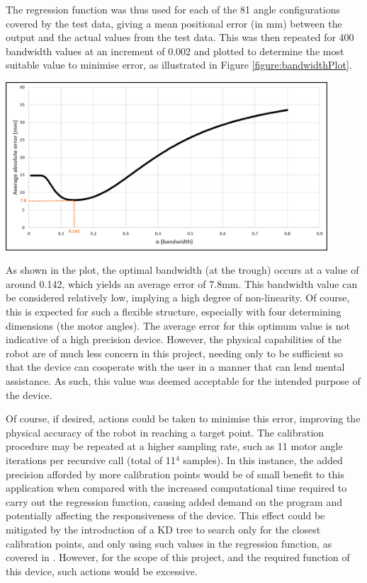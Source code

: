 \documentclass[11pt]{article}
\begin{document}
The regression function was thus used for each of the 81 angle configurations covered by the test data, giving a mean positional error (in mm) between the output and the actual values from the test data. This was then repeated for 400 bandwidth values at an increment of 0.002 and plotted to determine the most suitable value to minimise error, as illustrated in Figure \ref{figure:bandwidthPlot}.


\begin{center}
\includegraphics[width=0.9\textwidth]{images/newBandwidth.png}
\label{figure:bandwidthPlot}
\end{center}


As shown in the plot, the optimal bandwidth (at the trough) occurs at a value of around 0.142, which yields an average error of 7.8mm. This bandwidth value can be considered relatively low, implying a high degree of non-linearity. Of course, this is expected for such a flexible structure, especially with four determining dimensions (the motor angles). The average error for this optimum value is not indicative of a high precision device. However, the physical capabilities of the robot are of much less concern in this project, needing only to be sufficient so that the device can cooperate with the user in a manner that can lend mental assistance. As such, this value was deemed acceptable for the intended purpose of the device. 

Of course, if desired, actions could be taken to minimise this error, improving the physical accuracy of the robot in reaching a target point. The calibration procedure may be repeated at a higher sampling rate, such as 11 motor angle iterations per recursive call (total of 11$^4$ samples). In this instance, the added precision afforded by more calibration points would be of small benefit to this application when compared with the increased computational time required to carry out the regression function, causing added demand on the program and potentially affecting the responsiveness of the device. This effect could be mitigated by the introduction of a KD tree to search only for the closest calibration points, and only using such values in the regression function, as covered in \cite{GreggSmithPhd}. However, for the scope of this project, and the required function of this device, such actions would be excessive.
\end{document}
